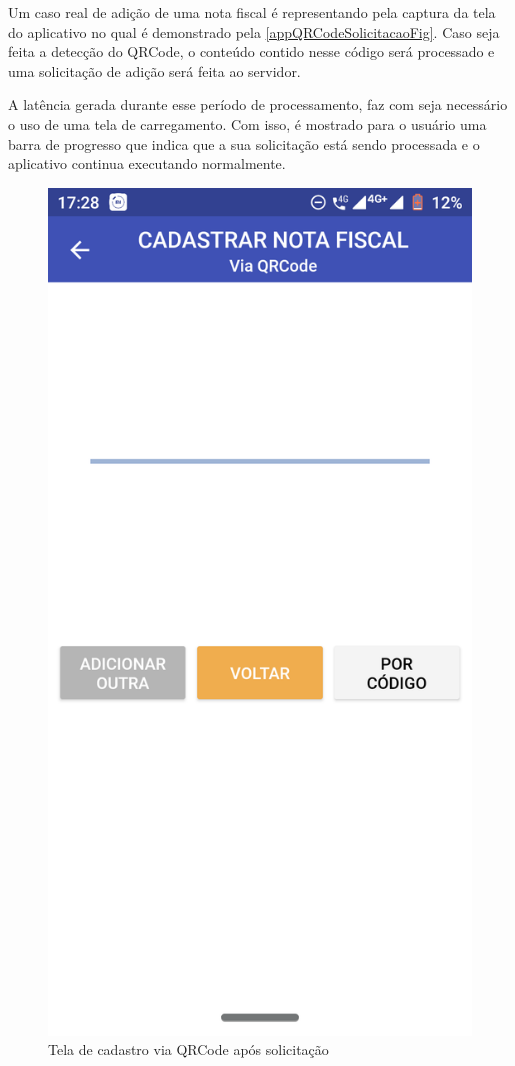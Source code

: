 Um caso real de adição de uma nota fiscal é representando pela captura da tela do aplicativo no qual é demonstrado pela \autoref{appQRCodeSolicitacaoFig}. Caso seja feita a detecção do QRCode, o conteúdo contido nesse código será processado e uma solicitação de adição será feita ao servidor.

A latência gerada durante esse período de processamento, faz com seja necessário o uso de uma tela de carregamento. Com isso, é mostrado para o usuário uma barra de progresso que indica que a sua solicitação está sendo processada e o aplicativo continua executando normalmente.

\begin{figure}[h]
    \centering
    \caption{Tela de cadastro via QRCode após solicitação}
    \includegraphics[scale=0.15]{tcc/figures/app/app_codigo_qrcode_loading.png}

\end{figure}
